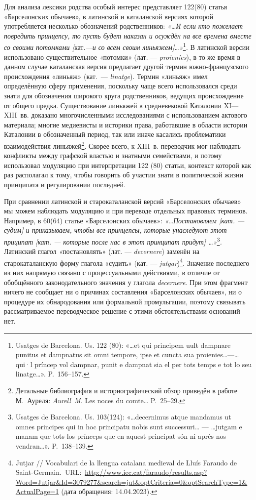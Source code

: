 Для анализа лексики родства особый интерес представляет 122(80) статья «Барселонских обычаев», в латинской и каталанской версиях которой употребляется несколько обозначений родственников: \emph{«}\emph{…И если кто пожелает повредить принцепсу, то пусть будет наказан и осуждён на все времена вместе со своими потомками [}кат.\emph{---и со всем своим линьяжем]…}\emph{»}\footnote{Usatges de Barcelona. Us. 122 (80): «…et qui principem uult dampnare punitus et dampnatus sit omni tempore, ipse et cuncta sua proienies…---…qui·l príncep vol dampnar, punit e dampnat sia el per tots temps e tot lo seu linatge…». P.~156--157.}\emph{.} В латинской версии использовано существительное\emph{ }\emph{«}потомки\emph{» }(лат. ---\emph{ }\emph{proienies}), в то же время в данном случае каталанская версия предлагает другой термин южно-французского происхождения «линьяж»\emph{ }(кат.~--- \emph{linatge}). Термин «линьяж» имел определённую сферу применения, поскольку чаще всего использовался среди знати для обозначения широкого круга родственников, ведущих происхождение от общего предка. Существование линьяжей в средневековой Каталонии XI---XIII~вв. доказано многочисленными исследованиями с использованием актового материала; многие медиевисты и историки права, работавшие в области истории Каталонии в обозначенный период, так или иначе касались проблематики взаимодействия линьяжей\footnote{Детальные библиография и историографический обзор приведён в работе М.~Ауреля: \emph{Aurell~M}\emph{.} Les noces du comte… P.~25--29.}. Скорее всего, к XIII~в. переводчик мог наблюдать конфликты между графской властью и знатными семействами, и потому использовал модуляцию при интерпретации 122 (80) статьи, контекст которой как раз располагал к тому, чтобы говорить об участии знати в политической жизни принципата и регулировании последней.

При сравнении латинской и старокаталанской версий «Барселонских обычаев» мы можем наблюдать модуляцию и при переводе отдельных правовых терминов. Например, в 60(64) статье «Барселонских обычаев»: \emph{«}\emph{…Постановляем [кат. --- судим] и приказываем, чтобы все принцепсы, которые унаследуют этот приципат [кат. --- которые после нас в этот принципат придут] …}\emph{»}\footnote{Usatges de Barcelona. Us. 103(124): «…decernimus atque mandamus ut omnes principes qui in hoc principatu nobis sunt successuri… --- …jutgam e manam que tots los prínceps que en aquest principat són ni aprés nos vendran…». P.~138--139.}\emph{.} Латинский глагол\emph{ }\emph{«}постановлять» (лат. ---\emph{ }\emph{decernere}) заменён на старокаталанскую форму глагола «судить» (кат. --- \emph{jutgar})\footnote{Jutjar // Vocabulari de la llengua catalana medieval de Lluís Faraudo de Saint-Germain.~URL:~\url{http://www.iec.cat/faraudo/results.asp?Word=Jutjar&Id=3079277&search=jut&optCriteria=0&optSearchType=1&ActualPage=1} (дата обращения: 14.04.2023).}. Значение последнего из них напрямую связано с процессуальными действиями, в отличие от обобщённого законодательного значения у глагола \emph{decernere}. При этом фрагмент ничего не сообщает ни о причинах составления «Барселонских обычаев», ни о процедуре их обнародования или формальной промульгации, поэтому связывать рассматриваемое переводческое решение с этими обстоятельствами оснований нет.

